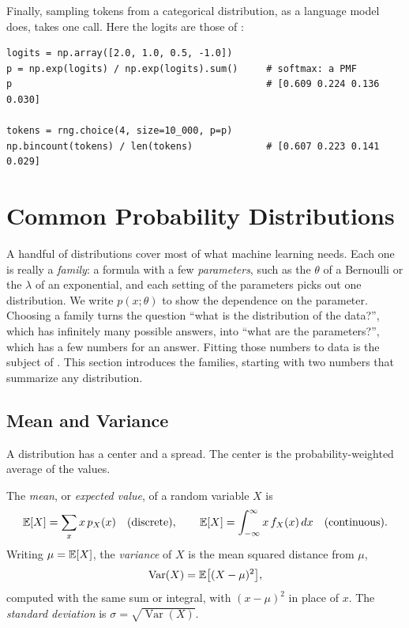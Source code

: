 Finally, sampling tokens from a categorical distribution, as a language
model does, takes one call. Here the logits are those of
:

\begin{lstlisting}
logits = np.array([2.0, 1.0, 0.5, -1.0])
p = np.exp(logits) / np.exp(logits).sum()     # softmax: a PMF
p                                             # [0.609 0.224 0.136 0.030]

tokens = rng.choice(4, size=10_000, p=p)
np.bincount(tokens) / len(tokens)             # [0.607 0.223 0.141 0.029]
\end{lstlisting}

\section{Common Probability Distributions}
\label{sec:ch05-distributions}

A handful of distributions cover most of what machine learning needs.
Each one is really a \emph{family}: a formula with a few
\emph{parameters}, such as the $\theta$ of a Bernoulli or the $\lambda$
of an exponential, and each setting of the parameters picks out one
distribution. We write $p(x; \theta)$ to show the dependence on the
parameter. Choosing a family turns the question ``what is the
distribution of the data?'', which has infinitely many possible
answers, into ``what are the parameters?'', which has a few numbers for
an answer. Fitting those numbers to data is the subject of
. This section introduces the families, starting with
two numbers that summarize any distribution.

\subsection{Mean and Variance}
\label{sec:ch05-moments}

A distribution has a center and a spread. The center is the
probability-weighted average of the values.

\begin{definition}
  \label{def:mean-variance}
  The \emph{mean}, or \emph{expected value}, of a random variable $X$ is
  \[
    \mathbb{E}[X] = \sum_x x \, p_X(x)
    \quad\text{(discrete)},
    \qquad
    \mathbb{E}[X] = \int_{-\infty}^{\infty} x \, f_X(x)\, dx
    \quad\text{(continuous)}.
  \]
  Writing $\mu = \mathbb{E}[X]$, the \emph{variance} of $X$ is the mean squared
  distance from $\mu$,
  \[
    \operatorname{Var}(X) = \mathbb{E}\bigl[(X - \mu)^2\bigr],
  \]
  computed with the same sum or integral, with $(x - \mu)^2$ in place of
  $x$. The \emph{standard deviation} is $\sigma = \sqrt{\operatorname{Var}(X)}$.
\end{definition}

